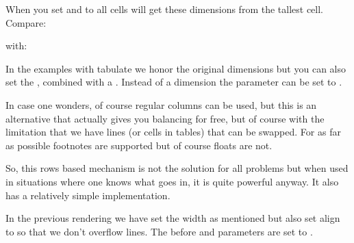 When you set  and  to  all cells will
get these dimensions from the tallest cell. Compare:

\startbuffer
\starttabulate[|l|l|]
 \NC {}           \NC \NR
{} \NC {}         \NC \NR
{} \NC {}    \NC \NR
{} \NC {} \NC \NR
\stoptabulate
\stopbuffer

\start{}
\startrows[n=2,before=\blank,after=\blank]
\getbuffer
\stoprows
\stop

with:

\start{}
\startrows[n=2,before=\blank,after=\blank,height=max,depth=max]
\getbuffer
\stoprows
\stop

In the examples with tabulate we honor the original dimensions but you can also
set the , combined with a . Instead of a dimension
the  parameter can be set to .

\start{}
\startrows[n=3,width=fit,distance=2em,align={verytolerant,stretch},before=\blank,after=\blank]
In case one wonders, of course regular columns can be used, but this is an
alternative that actually gives you balancing for free, but of course with the
limitation that we have lines (or cells in tables) that can be swapped. For as
far as possible footnotes are supported but of course floats are not.

So, this rows based mechanism is not the solution for all problems but when used
in situations where one knows what goes in, it is quite powerful anyway. It
also has a relatively simple implementation.
\stoprows
\stop

In the previous rendering we have set the width as mentioned but also set \type
{align} to  so that we don't overflow lines. The \type
{before} and  parameters are set to \type {\blank}.

\stopsectionlevel

\stopdocument

%

